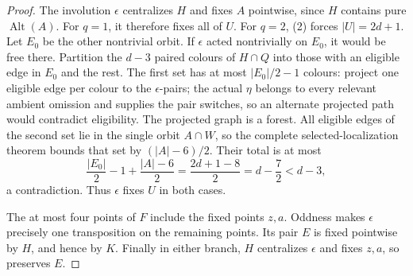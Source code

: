\documentclass[11pt,a4paper]{article}
\newcommand{\Alt}{\operatorname{Alt}}
\begin{document}
\begin{proof}
The involution $\epsilon$ centralizes $H$ and fixes $A$
pointwise, since $H$ contains pure $\Alt(A)$.
For $q=1$, it therefore fixes all of $U$.
For $q=2$, (2) forces $|U|=2d+1$. Let $E_0$ be the other
nontrivial orbit. If $\epsilon$ acted nontrivially on $E_0$,
it would be free there. Partition the $d-3$ paired colours
of $H\cap Q$ into those with an eligible edge in $E_0$
and the rest. The first set has at most $|E_0|/2-1$ colours:
project one eligible edge per colour to the $\epsilon$-pairs;
the actual $\eta$ belongs to every relevant ambient omission
and supplies the pair switches, so an alternate projected path
would contradict eligibility. The projected graph is a forest.
All eligible edges of the second set lie in the single orbit
$A\cap W$, so the complete selected-localization theorem bounds
that set by $(|A|-6)/2$. Their total is at most
\[
       \frac{|E_0|}{2}-1+\frac{|A|-6}{2}
        =\frac{2d+1-8}{2}=d-\frac72<d-3,
\]
a contradiction. Thus $\epsilon$ fixes $U$ in both cases.

The at most four points of $F$ include the fixed points $z,a$.
Oddness makes $\epsilon$ precisely one transposition on
the remaining points. Its pair $E$ is fixed pointwise by
$H$, and hence by $K$. Finally in either branch, $H$
centralizes $\epsilon$ and fixes $z,a$, so preserves $E$.
\end{proof}
\end{document}
